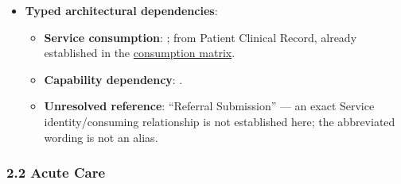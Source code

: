 \begin{itemize}
\begin{itemize}
\begin{itemize}
\item 
\emph{Exposed Service}: \texttt{} — Exposes aggregated multidisciplinary care timelines.



\end{itemize}


\end{itemize}


\item 
\textbf{Typed architectural dependencies}:


\begin{itemize}

\item 
\textbf{Service consumption}: \texttt{}; \texttt{} from Patient Clinical Record, already established in the \hyperref[rad:dependencies:46]{consumption matrix}.



\item 
\textbf{Capability dependency}: \texttt{}.



\item 
\textbf{Unresolved reference}: “Referral Submission” — an exact Service identity/\allowbreak{}consuming relationship is not established here; the abbreviated wording is not an alias.



\end{itemize}


\end{itemize}
\label{rad:sd:66}

\par\smallskip
{}\label{rad:sd:68}



\label{rad:sd:70}
\subsubsection*{2.2 Acute Care}
\label{rad:sd:71}

